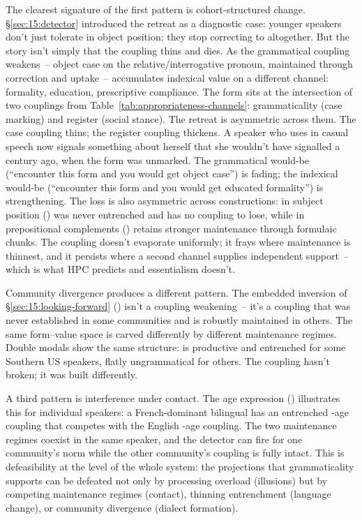 The clearest signature of the first pattern is cohort-structured change. §\ref{sec:15:detector} introduced the  retreat as a diagnostic case: younger speakers don't just tolerate  in object position; they stop correcting to  altogether. But the story isn't simply that the coupling thins and dies. As the grammatical coupling weakens~-- object case on the relative/interrogative pronoun, maintained through correction and uptake~--  accumulates indexical value on a different channel: formality, education, prescriptive compliance. The form sits at the intersection of two couplings from Table~\ref{tab:appropriateness-channels}: grammaticality (case marking) and register (social stance). The retreat is asymmetric across them. The case coupling thins; the register coupling thickens. A speaker who uses  in casual speech now signals something about herself that she wouldn't have signalled a century ago, when the form was unmarked. The grammatical would-be (\enquote{encounter this form and you would get object case}) is fading; the indexical would-be (\enquote{encounter this form and you would get educated formality}) is strengthening. The loss is also asymmetric across constructions:  in subject position (\ungram{}) was never entrenched and has no coupling to lose, while  in prepositional complements () retains stronger maintenance through formulaic chunks. The coupling doesn't evaporate uniformly; it frays where maintenance is thinnest, and it persists where a second channel supplies independent support~-- which is what HPC predicts and essentialism doesn't.

Community divergence produces a different pattern. The embedded inversion of §\ref{sec:15:looking-forward} () isn't a coupling weakening~-- it's a coupling that was never established in some communities and is robustly maintained in others. The same form--value space is carved differently by different maintenance regimes. Double modals show the same structure:  is productive and entrenched for some Southern US speakers, flatly ungrammatical for others. The coupling hasn't broken; it was built differently.

A third pattern is interference under contact. The age expression (\ungram{}) illustrates this for individual speakers: a French-dominant bilingual has an entrenched -age coupling that competes with the English -age coupling. The two maintenance regimes coexist in the same speaker, and the detector can fire for one community's norm while the other community's coupling is fully intact. This is defeasibility at the level of the whole system: the projections that grammaticality supports can be defeated not only by processing overload (illusions) but by competing maintenance regimes (contact), thinning entrenchment (language change), or community divergence (dialect formation).

